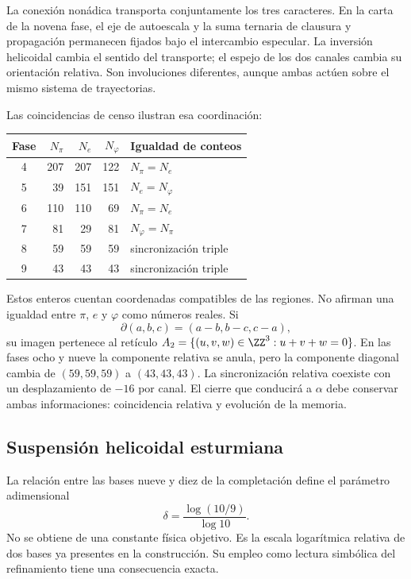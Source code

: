 La conexión nonádica transporta conjuntamente los tres caracteres. En la carta de la novena fase, el eje de autoescala y la suma ternaria de clausura y propagación permanecen fijados bajo el intercambio especular. La inversión helicoidal cambia el sentido del transporte; el espejo de los dos canales cambia su orientación relativa. Son involuciones diferentes, aunque ambas actúen sobre el mismo sistema de trayectorias.

Las coincidencias de censo ilustran esa coordinación:
\begin{center}
\begin{tabular}{@{}c rrr l@{}}\toprule
Fase&\(N_\pi\)&\(N_e\)&\(N_\varphi\)&Igualdad de conteos\\\midrule
4&207&207&122&\(N_\pi=N_e\)\\
5&39&151&151&\(N_e=N_\varphi\)\\
6&110&110&69&\(N_\pi=N_e\)\\
7&81&29&81&\(N_\varphi=N_\pi\)\\
8&59&59&59&sincronización triple\\
9&43&43&43&sincronización triple\\\bottomrule
\end{tabular}
\end{center}
Estos enteros cuentan coordenadas compatibles de las regiones. No afirman una igualdad entre \(\pi\), \(e\) y \(\varphi\) como números reales. Si
\[
 \partial(a,b,c)=(a-b,b-c,c-a),
\]
su imagen pertenece al retículo \(A_2=\{(u,v,w)\in\ZZ^3:u+v+w=0\}\). En las fases ocho y nueve la componente relativa se anula, pero la componente diagonal cambia de \((59,59,59)\) a \((43,43,43)\). La sincronización relativa coexiste con un desplazamiento de \(-16\) por canal. El cierre que conducirá a \(\alpha\) debe conservar ambas informaciones: coincidencia relativa y evolución de la memoria.

\subsection{Suspensión helicoidal esturmiana}

La relación entre las bases nueve y diez de la completación define el parámetro adimensional
\begin{equation}
 \delta=\frac{\log(10/9)}{\log10}.
 \label{eq:delta-sturm}
\end{equation}
No se obtiene de una constante física objetivo. Es la escala logarítmica relativa de dos bases ya presentes en la construcción. Su empleo como lectura simbólica del refinamiento tiene una consecuencia exacta.

